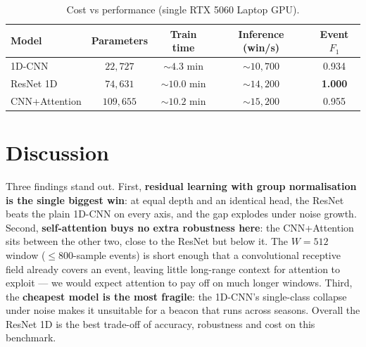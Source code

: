 \begin{table}[H]
    \centering \footnotesize
    \begin{tabular}{lcccc}
        \toprule
        Model & Parameters & Train time & Inference (win/s) & Event $F_1$ \\
        \midrule
        1D-CNN        & $22{,}727$  & $\sim 4.3$ min & $\sim 10{,}700$ & 0.934 \\
        ResNet 1D     & $74{,}631$  & $\sim 10.0$ min & $\sim 14{,}200$ & \textbf{1.000} \\
        CNN+Attention & $109{,}655$ & $\sim 10.2$ min & $\sim 15{,}200$ & 0.955 \\
        \bottomrule
    \end{tabular}
    \caption{Cost vs performance (single RTX 5060 Laptop GPU).}
    \label{tab:cost}
\end{table}

\section{Discussion}
\label{sec:res-disc}

Three findings stand out. First, \textbf{residual learning with group
normalisation is the single biggest win}: at equal depth and an identical head,
the ResNet beats the plain 1D-CNN on every axis, and the gap explodes under
noise growth. Second, \textbf{self-attention buys no extra robustness here}: the
CNN+Attention sits between the other two, close to the ResNet but below it. The
$W=512$ window ($\le 800$-sample events) is short enough that a convolutional
receptive field already covers an event, leaving little long-range context for
attention to exploit --- we would expect attention to pay off on much longer
windows. Third, the \textbf{cheapest model is the most fragile}: the 1D-CNN's
single-class collapse under noise makes it unsuitable for a beacon that runs
across seasons. Overall the ResNet 1D is the best trade-off of accuracy,
robustness and cost on this benchmark.
